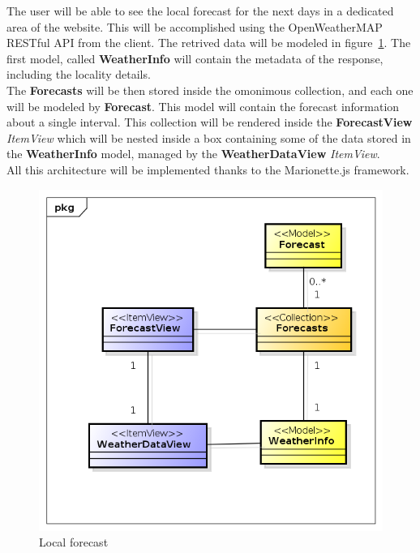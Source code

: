 The user will be able to see the local forecast for the next days in a dedicated area of the website. This will be accomplished using the OpenWeatherMAP RESTful API from the client. The retrived data will be modeled in figure~\ref{fig:forecastMVC}.
The first model, called \textbf{WeatherInfo} will contain the metadata of the response, including the locality details.\\
The \textbf{Forecasts} will be then stored inside the omonimous collection, and each one will be modeled by \textbf{Forecast}. This model will contain the forecast information about a single interval. This collection will be rendered inside the \textbf{ForecastView} \textit{ItemView} which will be nested inside a box containing some of the data stored in the \textbf{WeatherInfo} model, managed by the \textbf{WeatherDataView} \textit{ItemView}.\\
All this architecture will be implemented thanks to the Marionette.js framework.
\begin{center}
 \begin{figure}[H]
    \includegraphics[width=1\textwidth]{./BCEDiagram/BCE/EntityOverview/Forecast.png}
    \caption{Local forecast}
     \label{fig:forecastMVC}
     \end{figure}
   \end{center} 


